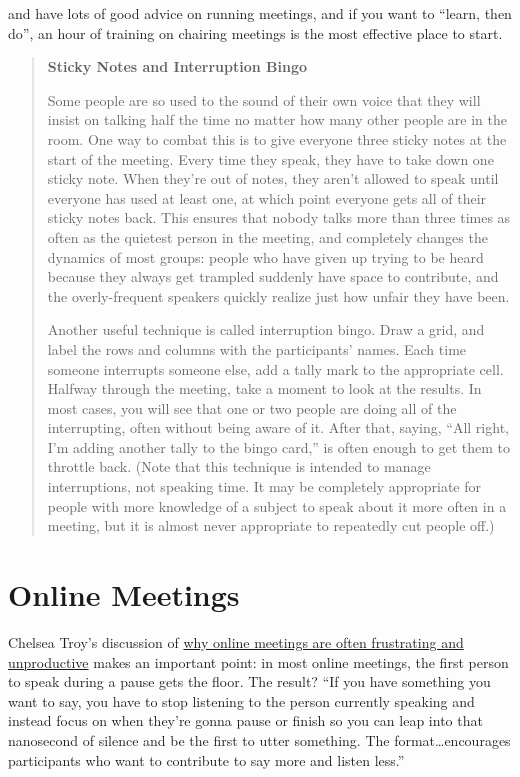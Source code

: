 \cite{Brow2007} and \cite{Broo2016} have lots of good advice on
running meetings, and if you want to ``learn, then do'', an hour of
training on chairing meetings is the most effective place to start.

\begin{quote}\setlength{\parindent}{0pt}
\textbf{Sticky Notes and Interruption Bingo}

Some people are so used to the sound of their own voice that they will
insist on talking half the time no matter how many other people are in
the room. One way to combat this is to give everyone three sticky
notes at the start of the meeting. Every time they speak, they have to
take down one sticky note. When they're out of notes, they aren't
allowed to speak until everyone has used at least one, at which point
everyone gets all of their sticky notes back. This ensures that nobody
talks more than three times as often as the quietest person in the
meeting, and completely changes the dynamics of most groups: people
who have given up trying to be heard because they always get trampled
suddenly have space to contribute, and the overly-frequent speakers
quickly realize just how unfair they have been.

Another useful technique is called interruption bingo. Draw a grid,
and label the rows and columns with the participants' names. Each time
someone interrupts someone else, add a tally mark to the appropriate
cell. Halfway through the meeting, take a moment to look at the
results. In most cases, you will see that one or two people are doing
all of the interrupting, often without being aware of it. After that,
saying, ``All right, I'm adding another tally to the bingo card,'' is
often enough to get them to throttle back. (Note that this technique
is intended to manage interruptions, not speaking time. It may be
completely appropriate for people with more knowledge of a subject to
speak about it more often in a meeting, but it is almost never
appropriate to repeatedly cut people off.)
\end{quote}

\section{Online Meetings}\label{online-meetings}

Chelsea Troy's discussion of \href{https://chelseatroy.com/2018/03/29/why-do-remote-meetings-suck-so-much/}{why online meetings are often
frustrating and unproductive} makes an important point:
in most online meetings, the first person to speak during a pause gets
the floor. The result? ``If you have something you want to say, you
have to stop listening to the person currently speaking and instead
focus on when they're gonna pause or finish so you can leap into that
nanosecond of silence and be the first to utter something. The
format\ldots{}encourages participants who want to contribute to say more
and listen less.''

